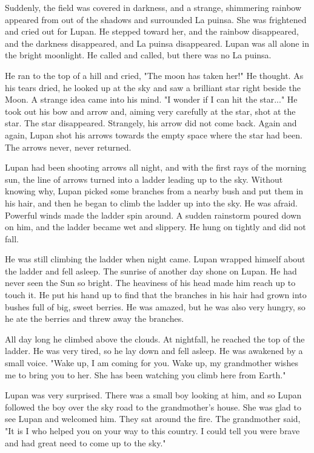 Suddenly, the field was covered in darkness, and a strange, shimmering rainbow appeared from out of the shadows and surrounded La puinsa. She was frightened and cried out for Lupan. He stepped toward her, and the rainbow disappeared, and the darkness disappeared, and La puinsa disappeared. Lupan was all alone in the bright moonlight. He called and called, but there was no La puinsa.

He ran to the top of a hill and cried, "The moon has taken her!" He thought. As his tears dried, he looked up at the sky and saw a brilliant star right beside the Moon. A strange idea came into his mind. "I wonder if I can hit the star..." He took out his bow and arrow and, aiming very carefully at the star, shot at the star. The star disappeared. Strangely, his arrow did not come back. Again and again, Lupan shot his arrows towards the empty space where the star had been. The arrows never, never returned.

Lupan had been shooting arrows all night, and with the first rays of the morning sun, the line of arrows turned into a ladder leading up to the sky. Without knowing why, Lupan picked some branches from a nearby bush and put them in his hair, and then he began to climb the ladder up into the sky. He was afraid. Powerful winds made the ladder spin around. A sudden rainstorm poured down on him, and the ladder became wet and slippery. He hung on tightly and did not fall.

He was still climbing the ladder when night came. Lupan wrapped himself about the ladder and fell asleep. The sunrise of another day shone on Lupan. He had never seen the Sun so bright. The heaviness of his head made him reach up to touch it. He put his hand up to find that the branches in his hair had grown into bushes full of big, sweet berries. He was amazed, but he was also very hungry, so he ate the berries and threw away the branches.

All day long he climbed above the clouds. At nightfall, he reached the top of the ladder. He was very tired, so he lay down and fell asleep. He was awakened by a small voice. "Wake up, I am coming for you. Wake up, my grandmother wishes me to bring you to her. She has been watching you climb here from Earth."

Lupan was very surprised. There was a small boy looking at him, and so Lupan followed the boy over the sky road to the grandmother's house. She was glad to see Lupan and welcomed him. They sat around the fire. The grandmother said, "It is I who helped you on your way to this country. I could tell you were brave and had great need to come up to the sky."

